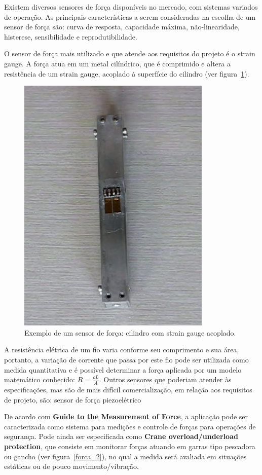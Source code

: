  Existem diversos sensores de força disponíveis no mercado, com sistemas variados de operação. As principais características a serem consideradas na escolha de um sensor de força são: curva de resposta, capacidade máxima, não-linearidade, histerese, sensibilidade e reprodutibilidade.

 O sensor de força mais utilizado e que atende aos requisitos do projeto é o strain gauge. A força atua em um metal cilíndrico, que é comprimido e altera a resistência de um strain gauge, acoplado à superfície do cilindro (ver figura~\ref{forca_1}).

 \begin{figure}[H]
    \centering
    \includegraphics[width=0.4\columnwidth]{figs/forca/1.png}
    \caption{Exemplo de um sensor de força: cilindro com strain gauge acoplado.}
    \label{forca_1}
\end{figure}


 A resistência elétrica de um fio varia conforme seu comprimento e sua área, portanto, a variação de corrente que passa por este fio pode ser utilizada como medida quantitativa e é possível determinar a força aplicada por um modelo matemático conhecido: $R=\frac{\rho L}{A}$. Outros sensores que poderiam atender às especificações, mas são de mais difícil comercialização, em relação aos requisitos de projeto, são: sensor de força piezoelétrico

 De acordo com \textbf{Guide to the Measurement of Force}, a aplicação pode ser caracterizada como sistema para medições e controle de forças para operações de segurança. Pode ainda ser especificada como \textbf{Crane overload/underload protection}, que consiste em monitorar forças atuando em garras tipo pescadora ou gancho (ver figura~\ref{forca_2}), no qual a medida será avaliada em situações estáticas ou de pouco movimento/vibração.

